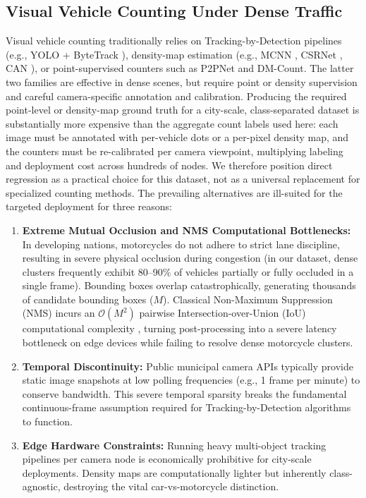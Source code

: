 \documentclass[a4paper,fleqn]{cas-sc}
\begin{document}
\subsection{Visual Vehicle Counting Under Dense Traffic}
Visual vehicle counting traditionally relies on Tracking-by-Detection pipelines (e.g., YOLO + ByteTrack \cite{yolo}), density-map estimation (e.g., MCNN \cite{mcnn}, CSRNet \cite{csrnet}, CAN \cite{can}), or point-supervised counters such as P2PNet and DM-Count. The latter two families are effective in dense scenes, but require point or density supervision and careful camera-specific annotation and calibration. Producing the required point-level or density-map ground truth for a city-scale, class-separated dataset is substantially more expensive than the aggregate count labels used here: each image must be annotated with per-vehicle dots or a per-pixel density map, and the counters must be re-calibrated per camera viewpoint, multiplying labeling and deployment cost across hundreds of nodes. We therefore position direct regression as a practical choice for this dataset, not as a universal replacement for specialized counting methods. The prevailing alternatives are ill-suited for the targeted deployment for three reasons:
\begin{enumerate}
    \item \textbf{Extreme Mutual Occlusion and NMS Computational Bottlenecks:} In developing nations, motorcycles do not adhere to strict lane discipline, resulting in severe physical occlusion during congestion (in our dataset, dense clusters frequently exhibit 80--90\% of vehicles partially or fully occluded in a single frame). Bounding boxes overlap catastrophically, generating thousands of candidate bounding boxes ($M$). Classical Non-Maximum Suppression (NMS) incurs an $\mathcal{O}(M^2)$ pairwise Intersection-over-Union (IoU) computational complexity \cite{softnms}, turning post-processing into a severe latency bottleneck on edge devices while failing to resolve dense motorcycle clusters.
    \item \textbf{Temporal Discontinuity:} Public municipal camera APIs typically provide static image snapshots at low polling frequencies (e.g., 1 frame per minute) to conserve bandwidth. This severe temporal sparsity breaks the fundamental continuous-frame assumption required for Tracking-by-Detection algorithms to function.
    \item \textbf{Edge Hardware Constraints:} Running heavy multi-object tracking pipelines per camera node is economically prohibitive for city-scale deployments. Density maps are computationally lighter but inherently class-agnostic, destroying the vital car-vs-motorcycle distinction.
\end{enumerate}
\end{document}
